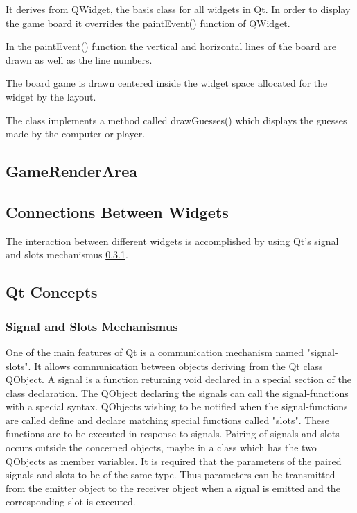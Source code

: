 It derives from QWidget, the basis class for all widgets in Qt. In order to display the game board it overrides the paintEvent() function of QWidget. 

In the paintEvent() function the vertical and horizontal lines of the board are drawn as well as the line numbers.

The board game is drawn centered inside the widget space allocated for the widget by the layout.

The class implements a method called drawGuesses() which displays the guesses made by the computer or player.

\subsection{GameRenderArea}

\subsection{Connections Between Widgets}

The interaction between different widgets is accomplished by using Qt's signal and slots mechanismus \ref{Qt_Signals_Slots}. 


\subsection {Qt Concepts}

\subsubsection{Signal and Slots Mechanismus} \label {Qt_Signals_Slots}

One of the main features of Qt is a communication mechanism named "signal-slots". It allows communication between objects deriving from the Qt class QObject. A signal is a function returning void declared in a special section of the class declaration. The QObject declaring the signals can call the signal-functions with a special syntax. QObjects wishing to be notified when the signal-functions are called define and declare matching special functions called "slots". These functions are to be executed in response to signals. Pairing of signals and slots occurs outside the concerned objects, maybe in a class which has the two QObjects as member variables. It is required that the parameters of the paired signals and slots to be of the same type. Thus parameters can be transmitted from the emitter object to the receiver object when a signal is emitted and the corresponding slot is executed. 

